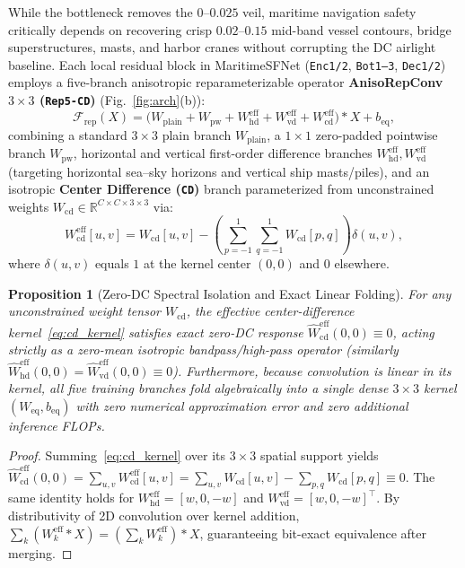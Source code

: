 \documentclass[journal,twoside]{IEEEtran}
\newtheorem{proposition}{Proposition}
\begin{document}
While the bottleneck removes the $0\text{--}0.025$ veil, maritime navigation safety critically depends on recovering crisp $0.02\text{--}0.15$ mid-band vessel contours, bridge superstructures, masts, and harbor cranes without corrupting the DC airlight baseline. Each local residual block in MaritimeSFNet (\texttt{Enc1/2}, \texttt{Bot1--3}, \texttt{Dec1/2}) employs a five-branch anisotropic reparameterizable operator \textbf{AnisoRepConv $3\times 3$ (\texttt{Rep5-CD})} (Fig.~\ref{fig:arch}(b)):
\begin{equation}
\mathcal{F}_{\mathrm{rep}}(X) = \Big(W_{\mathrm{plain}} + W_{\mathrm{pw}} + W_{\mathrm{hd}}^{\mathrm{eff}} + W_{\mathrm{vd}}^{\mathrm{eff}} + W_{\mathrm{cd}}^{\mathrm{eff}}\Big) * X + b_{\mathrm{eq}},
\label{eq:rep5}
\end{equation}
combining a standard $3\times 3$ plain branch $W_{\mathrm{plain}}$, a $1\times 1$ zero-padded pointwise branch $W_{\mathrm{pw}}$, horizontal and vertical first-order difference branches $W_{\mathrm{hd}}^{\mathrm{eff}}, W_{\mathrm{vd}}^{\mathrm{eff}}$ (targeting horizontal sea--sky horizons and vertical ship masts/piles), and an isotropic \textbf{Center Difference (\texttt{CD})} branch parameterized from unconstrained weights $W_{\mathrm{cd}}\in\mathbb{R}^{C\times C\times 3\times 3}$ via:
\begin{equation}
W_{\mathrm{cd}}^{\mathrm{eff}}[u,v] = W_{\mathrm{cd}}[u,v] - \left(\sum_{p=-1}^{1}\sum_{q=-1}^{1} W_{\mathrm{cd}}[p,q]\right)\delta(u,v),
\label{eq:cd_kernel}
\end{equation}
where $\delta(u,v)$ equals $1$ at the kernel center $(0,0)$ and $0$ elsewhere.

\begin{proposition}[Zero-DC Spectral Isolation and Exact Linear Folding]
\label{prop:cd}
For any unconstrained weight tensor $W_{\mathrm{cd}}$, the effective center-difference kernel~\eqref{eq:cd_kernel} satisfies exact zero-DC response $\widehat{W}_{\mathrm{cd}}^{\mathrm{eff}}(0,0) \equiv 0$, acting strictly as a zero-mean isotropic bandpass/high-pass operator (similarly $\widehat{W}_{\mathrm{hd}}^{\mathrm{eff}}(0,0) = \widehat{W}_{\mathrm{vd}}^{\mathrm{eff}}(0,0) \equiv 0$). Furthermore, because convolution is linear in its kernel, all five training branches fold algebraically into a single dense $3\times 3$ kernel $(W_{\mathrm{eq}}, b_{\mathrm{eq}})$ with zero numerical approximation error and zero additional inference FLOPs.
\end{proposition}

\begin{proof}
Summing~\eqref{eq:cd_kernel} over its $3\times 3$ spatial support yields $\widehat{W}_{\mathrm{cd}}^{\mathrm{eff}}(0,0) = \sum_{u,v} W_{\mathrm{cd}}^{\mathrm{eff}}[u,v] = \sum_{u,v} W_{\mathrm{cd}}[u,v] - \sum_{p,q} W_{\mathrm{cd}}[p,q] \equiv 0$. The same identity holds for $W_{\mathrm{hd}}^{\mathrm{eff}} = [w, 0, -w]$ and $W_{\mathrm{vd}}^{\mathrm{eff}} = [w, 0, -w]^{\top}$. By distributivity of 2D convolution over kernel addition, $\sum_k (W_k^{\mathrm{eff}} * X) = (\sum_k W_k^{\mathrm{eff}}) * X$, guaranteeing bit-exact equivalence after merging.
\end{proof}
\end{document}
